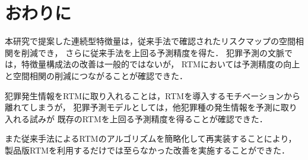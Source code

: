 \section{おわりに}
本研究で提案した連続型特徴量は，従来手法で確認されたリスクマップの空間相関を削減でき，
さらに従来手法を上回る予測精度を得た．
犯罪予測の文脈では，特徴量構成法の改善は一般的ではないが，
RTMにおいては予測精度の向上と空間相関の削減につながることが確認できた．

犯罪発生情報をRTMに取り入れることは，RTMを導入するモチベーションから離れてしまうが，
犯罪予測モデルとしては，他犯罪種の発生情報を予測に取り入れる試みが
既存のRTMを上回る予測精度を得ることが確認できた．

また従来手法によるRTMのアルゴリズムを簡略化して再実装することにより，
製品版RTMを利用するだけでは至らなかった改善を実施することができた．

% 




